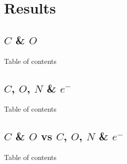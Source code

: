 \section{Results}
\SectionPage

\subsection{$C$ \& $O$}
\begin{frame}{Table of contents}
    \tableofcontents[currentsubsection]
\end{frame}



%

\subsection{$C$, $O$, $N$ \& $e^{-}$}
\begin{frame}{Table of contents}
    \tableofcontents[currentsubsection]
\end{frame}

%



\subsection{$C$ \& $O$ vs $C$, $O$, $N$ \& $e^{-}$}
\begin{frame}{Table of contents}
    \tableofcontents[currentsubsection]
\end{frame}
